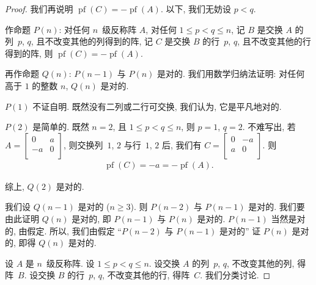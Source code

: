 \begin{proof}
    我们再说明
    \(
    \operatorname{pf} {(C)} = -\operatorname{pf} {(A)}
    \).
    以下, 我们无妨设 \(p < q\).

    作命题 \(P(n)\):
    对任何 \(n\)~级反称阵 \(A\),
    对任何 \(1 \leq p < q \leq n\),
    记 \(B\) 是交换 \(A\) 的列~\(p\), \(q\), 且不改变其他的列得到的阵,
    记 \(C\) 是交换 \(B\) 的行~\(p\), \(q\), 且不改变其他的行得到的阵,
    则 \(
    \operatorname{pf} {(C)} = -\operatorname{pf} {(A)}
    \).

    再作命题 \(Q(n)\):
    \(P(n-1)\) 与 \(P(n)\) 是对的.
    我们用数学归纳法证明:
    对任何高于 \(1\) 的整数 \(n\), \(Q(n)\) 是对的.

    \(P(1)\) 不证自明.
    既然没有二列或二行可交换,
    我们认为, 它是平凡地对的.

    \(P(2)\) 是简单的.
    既然 \(n = 2\), 且 \(1 \leq p < q \leq n\),
    则 \(p = 1\), \(q = 2\).
    不难写出, 若 \(A =
    \begin{bmatrix}
        0  & a \\
        -a & 0 \\
    \end{bmatrix}
    \),
    则交换列~\(1\), \(2\)
    与行~\(1\), \(2\) 后,
    我们有 \(C =
    \begin{bmatrix}
        0 & -a \\
        a & 0  \\
    \end{bmatrix}
    \).
    则
    \begin{align*}
        \operatorname{pf} {(C)}
        = -a
        = -\operatorname{pf} {(A)}.
    \end{align*}

    综上, \(Q(2)\) 是对的.

    我们设 \(Q(n-1)\) 是对的 (\(n \geq 3\)).
    则 \(P(n-2)\) 与 \(P(n-1)\) 是对的.
    我们要由此证明 \(Q(n)\) 是对的,
    即 \(P(n-1)\) 与 \(P(n)\) 是对的.
    \(P(n-1)\) 当然是对的, 由假定.
    所以, 我们由假定
    ``\(P(n-2)\) 与 \(P(n-1)\) 是对的''
    证 \(P(n)\) 是对的,
    即得 \(Q(n)\) 是对的.

    设 \(A\) 是 \(n\)~级反称阵.
    设 \(1 \leq p < q \leq n\).
    设交换 \(A\) 的列~\(p\), \(q\), 不改变其他的列, 得阵~\(B\).
    设交换 \(B\) 的行~\(p\), \(q\), 不改变其他的行, 得阵~\(C\).
    我们分类讨论.


\end{proof}
